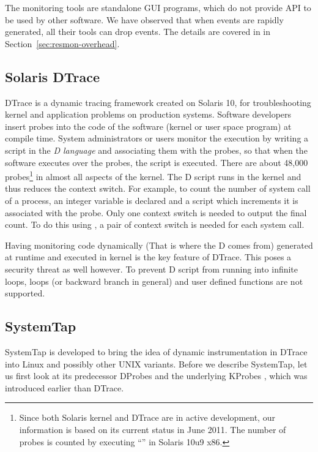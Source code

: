 The monitoring tools are standalone GUI programs, which do not
provide API to be used by other software.
We have observed that when events are rapidly generated, all their tools
can drop events.
The details are covered in in Section~\ref{sec:resmon-overhead}.

\subsection{Solaris DTrace}
\label{sec:dtrace}

DTrace\cite{cantrill2004dynamic} is a dynamic tracing framework
created on Solaris 10, for troubleshooting kernel and application problems
on production systems.
Software developers insert probes into the code of the software
(kernel or user space program) at compile time.
System administrators or users monitor the execution by writing
a script in the {\em D language} and associating them with the probes,
so that when the software executes over the probes, the script is executed.
There are about 48,000 probes\footnote{
Since both Solaris kernel and DTrace are in active development,
our information is based on its current status in June 2011.
The number of probes is counted by executing ``''
in Solaris 10u9 x86.
}
in almost all aspects of the kernel.
The D script runs in the kernel and thus reduces the context switch.
For example, to count the number of  system call of a process,
an integer variable is declared and a script which increments it
is associated with the  probe.
Only one context switch is needed to output the final count.
To do this using , a pair of context switch is
needed for each  system call.

Having monitoring code dynamically (That is where the D comes from)
generated at runtime and executed in kernel is the key feature of
DTrace.
This poses a security threat as well however.
To prevent D script from running into infinite loops,
loops (or backward branch in general) and user defined functions
are not supported.

\subsection{SystemTap}
\label{sec:systemtap}

SystemTap \cite{prasad2005systemtap} is developed to bring the idea of dynamic instrumentation
in DTrace into Linux and possibly other UNIX variants.
Before we describe SystemTap, let us first look at its predecessor
DProbes \cite{moore2001dprobes} and the underlying KProbes \cite{mavinakayanahalli2006kprobes},
which was introduced earlier than DTrace.

